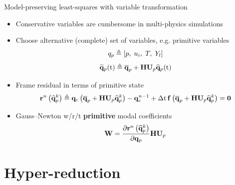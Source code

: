 \documentclass[]{beamer}
\begin{document}
\begin{frame}{Model-preserving least-squares with variable transformation}
    \begin{itemize}
		\item Conservative variables are cumbersome in multi-physics simulations
		\item Choose alternative (complete) set of variables, e.g. primitive variables
		\begin{equation*}
			q_p \triangleq \left[ p, \; u_i, \; T, \; Y_l \right]
		\end{equation*}
		\begin{equation*}
			\primVecRom(\timeVar) \triangleq \primVecCent + \primScale \primTrial \primVecCoef(\timeVar)
		\end{equation*}
		\item Frame residual in terms of primitive state
		\begin{equation*}
			\resFuncIter{\timeIdx}{\primVecCoef^{\newtonIdx}} \triangleq \consFunc{\primVecCent + \primScale \primTrial \primVecCoef^{\newtonIdx}} - \consVec^{\timeIdx-1} + \dt \, \rhsFunc{\primVecCent + \primScale \primTrial \primVecCoef^{\newtonIdx}} = \zeroVec
		\end{equation*}
		\item Gauss--Newton w/r/t \textbf{primitive} modal coefficients
		\begin{equation*}
			\testBasis = \pde{\resFuncIter{\timeIdx}{\primVecCoef^{\newtonIdx}}}{\primVec} \primScale \primTrial
		\end{equation*}
	\end{itemize}
\end{frame}

\section*{Hyper-reduction}
\end{document}
